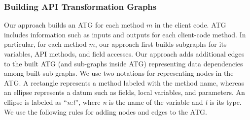 \subsubsection{Building API Transformation Graphs} 

Our approach builds an ATG for each method $m$ in the client code.
ATG includes information such as inputs
and outputs for each client-code method. In particular, for
each method $m$, our approach first builds subgraphs for its variables,
API methods, and field accesses. Our approach adds additional edges
to the built ATG (and sub-graphs inside ATG) representing
data dependencies among built sub-graphs.
We use two notations for representing nodes in the ATG. A rectangle
represents a method labeled with the method name, whereas an ellipse
represents a datum such as fields, local variables, and parameters.
An ellipse is labeled as ``\emph{n:t}'', where \emph{n} is the name
of the variable and \emph{t} is its type. We use the 
following rules for adding nodes and edges to the ATG.



%

